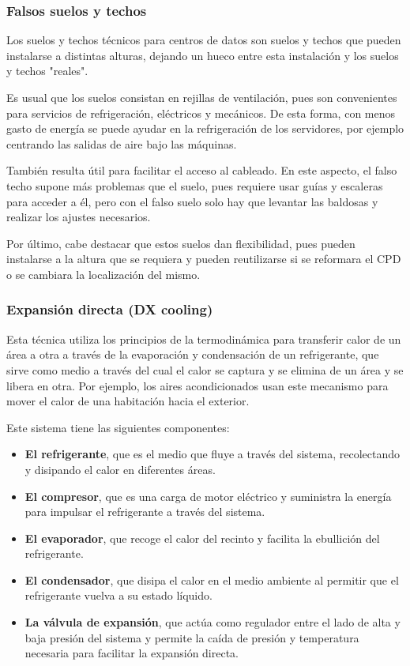 \subsubsection{Falsos suelos y techos}

Los suelos y techos técnicos para centros de datos son suelos y techos que pueden instalarse a distintas alturas, dejando un hueco entre esta instalación y los suelos y techos "reales".

Es usual que los suelos consistan en rejillas de ventilación, pues son convenientes para servicios de refrigeración, eléctricos y mecánicos. De esta forma, con menos gasto de energía se puede ayudar en la refrigeración de los servidores, por ejemplo centrando las salidas de aire bajo las máquinas.

También resulta útil para facilitar el acceso al cableado. En este aspecto, el falso techo supone más problemas que el suelo, pues requiere usar guías y escaleras para acceder a él, pero con el falso suelo solo hay que levantar las baldosas y realizar los ajustes necesarios.

Por último, cabe destacar que estos suelos dan flexibilidad, pues pueden instalarse a la altura que se requiera y pueden reutilizarse si se reformara el CPD o se cambiara la localización del mismo.

\subsubsection{Expansión directa (DX cooling)}

Esta técnica utiliza los principios de la termodinámica para transferir calor de un área a otra a través de la evaporación y condensación de un refrigerante, que sirve como medio a través del cual el calor se captura y se elimina de un área y se libera en otra. Por ejemplo, los aires acondicionados usan este mecanismo para mover el calor de una habitación hacia el exterior.

Este sistema tiene las siguientes componentes:

\begin{itemize}
    \item {\textbf{El refrigerante}}, que es el medio que fluye a través del sistema, recolectando y disipando el calor en diferentes áreas.
    \item \textbf{El compresor}, que es una carga de motor eléctrico y suministra la energía para impulsar el refrigerante a través del sistema.
    \item \textbf{El evaporador}, que recoge el calor del recinto y facilita la ebullición del refrigerante.
    \item \textbf{El condensador}, que disipa el calor en el medio ambiente al permitir que el refrigerante vuelva a su estado líquido.
    \item \textbf{La válvula de expansión}, que actúa como regulador entre el lado de alta y baja presión del sistema y permite la caída de presión y temperatura necesaria para facilitar la expansión directa.
\end{itemize}

